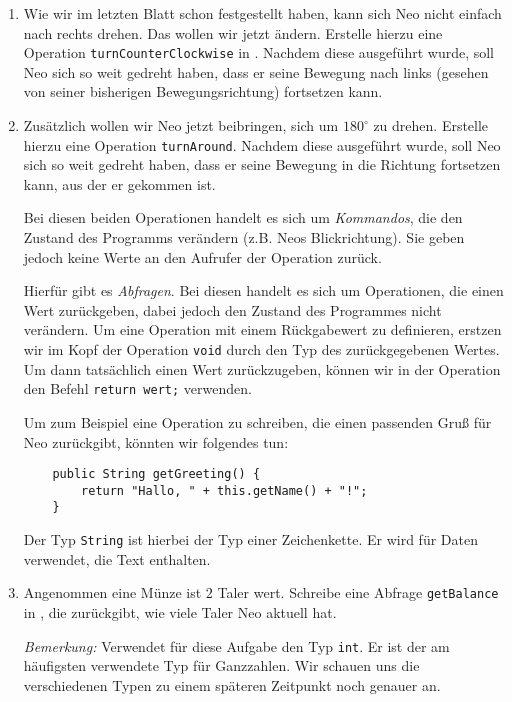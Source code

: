     \begin{enumerate}
        \item
        Wie wir im letzten Blatt schon festgestellt haben, kann sich Neo nicht einfach nach rechts drehen. Das wollen wir jetzt ändern.
        Erstelle hierzu eine Operation \lstinline{turnCounterClockwise} in \ownclass. Nachdem diese ausgeführt wurde, soll Neo sich so weit gedreht haben, dass er seine Bewegung nach links (gesehen von seiner bisherigen Bewegungsrichtung) fortsetzen kann.
    
    
        \item
        Zusätzlich wollen wir Neo jetzt beibringen, sich um \(180^\circ\) zu drehen.
        Erstelle hierzu eine Operation \lstinline{turnAround}.
        Nachdem diese ausgeführt wurde, soll Neo sich so weit gedreht haben, dass er seine Bewegung in die Richtung fortsetzen kann, aus der er gekommen ist.
    
    
        Bei diesen beiden Operationen handelt es sich um \emph{Kommandos}, die den Zustand des Programms verändern (z.B. Neos Blickrichtung). Sie geben jedoch keine Werte an den Aufrufer der Operation zurück.
    
        Hierfür gibt es \emph{Abfragen}. Bei diesen handelt es sich um Operationen, die einen Wert zurückgeben, dabei jedoch den Zustand des Programmes nicht verändern. Um eine Operation mit einem Rückgabewert zu definieren, erstzen wir im Kopf der Operation \lstinline{void} durch den Typ des zurückgegebenen Wertes. Um dann tatsächlich einen Wert zurückzugeben, können wir in der Operation den Befehl \lstinline{return wert;} verwenden.
    
        Um zum Beispiel eine Operation zu schreiben, die einen passenden Gruß für Neo zurückgibt, könnten wir folgendes tun:
        \begin{lstlisting}
    public String getGreeting() {
        return "Hallo, " + this.getName() + "!";
    }
        \end{lstlisting}
        Der Typ \lstinline{String} ist hierbei der Typ einer Zeichenkette. Er wird für Daten verwendet, die Text enthalten.
    
        \item Angenommen eine Münze ist \(2\) Taler wert. Schreibe eine Abfrage
        \lstinline{getBalance} in \ownclass{}, die  zurückgibt, wie viele Taler Neo aktuell hat.
    
        \emph{Bemerkung:} Verwendet für diese Aufgabe den Typ \lstinline{int}. Er ist der am häufigsten verwendete Typ für Ganzzahlen. Wir schauen uns die verschiedenen Typen zu einem späteren Zeitpunkt noch genauer an.
    

\end{enumerate}
